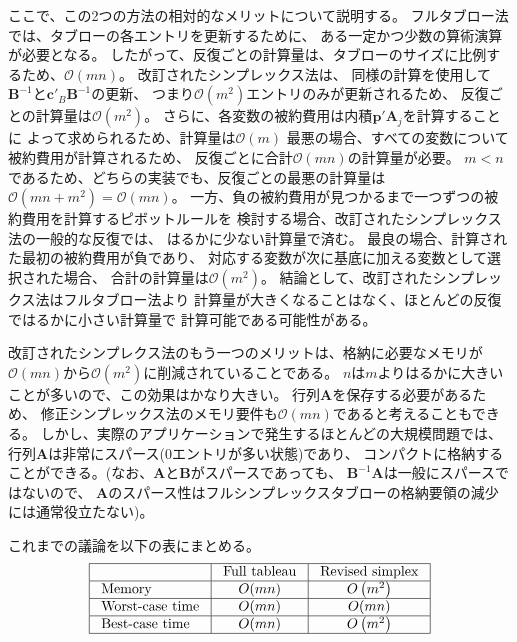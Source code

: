 \documentclass{jsarticle}
\begin{document}
ここで、この2つの方法の相対的なメリットについて説明する。
フルタブロー法では、タブローの各エントリを更新するために、
ある一定かつ少数の算術演算が必要となる。
したがって、反復ごとの計算量は、タブローのサイズに比例するため、$\mathcal{O}(mn)$。
改訂されたシンプレックス法は、
同様の計算を使用して$\bm{B}^{-1}$と$\bm{c}'_B\bm{B}^{-1}$の更新、
つまり$\mathcal{O}(m^2)$エントリのみが更新されるため、
反復ごとの計算量は$\mathcal{O}(m^2)$。
さらに、各変数の被約費用は内積$\bm{p}'\bm{A}_j$を計算することに
よって求められるため、計算量は$\mathcal{O}(m)$
最悪の場合、すべての変数について被約費用が計算されるため、
反復ごとに合計$\mathcal{O}(mn)$の計算量が必要。
$m<n$であるため、どちらの実装でも、反復ごとの最悪の計算量は
$\mathcal{O}(mn+m^2)=\mathcal{O}(mn)$。 
一方、負の被約費用が見つかるまで一つずつの被約費用を計算するピボットルールを
検討する場合、改訂されたシンプレックス法の一般的な反復では、
はるかに少ない計算量で済む。
最良の場合、計算された最初の被約費用が負であり、
対応する変数が次に基底に加える変数として選択された場合、
合計の計算量は$\mathcal{O}(m^2)$。
結論として、改訂されたシンプレックス法はフルタブロー法より
計算量が大きくなることはなく、ほとんどの反復ではるかに小さい計算量で
計算可能である可能性がある。

改訂されたシンプレクス法のもう一つのメリットは、格納に必要なメモリが
$\mathcal{O}(mn)$から$\mathcal{O}(m^2)$に削減されていることである。
$n$は$m$よりはるかに大きいことが多いので、この効果はかなり大きい。
行列$\bm{A}$を保存する必要があるため、
修正シンプレックス法のメモリ要件も$\mathcal{O}(mn)$であると考えることもできる。
しかし、実際のアプリケーションで発生するほとんどの大規模問題では、
行列$\bm{A}$は非常にスパース(0エントリが多い状態)であり、
コンパクトに格納することができる。(なお、$\bm{A}$と$\bm{B}$がスパースであっても、
$\bm{B}^{-1}\bm{A}$は一般にスパースではないので、
$\bm{A}$のスパース性はフルシンプレックスタブローの格納要領の減少には通常役立たない)。

これまでの議論を以下の表にまとめる。
\begin{equation}
  \begin{array}{|l|c|c|}
  \hline & \text { Full tableau } & \text { Revised simplex } \\
  \hline \text { Memory } & O(m n) & O\left(m^{2}\right) \\
  \hline \text { Worst-case time } & O(m n) & O(m n) \\
  \hline \text { Best-case time } & O(m n) & O\left(m^{2}\right) \\
  \hline
  \end{array}
\end{equation}
\end{document}
